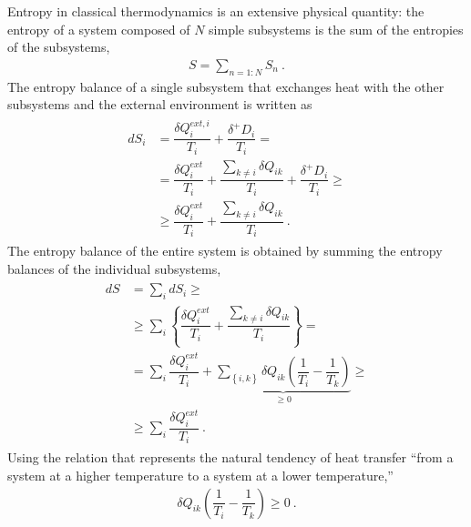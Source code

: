 \documentclass[letterpaper,10pt,english]{jupyterBook}
\begin{document}
\sphinxAtStartPar
Entropy in classical thermodynamics is an extensive physical quantity: the entropy of a system composed of \(N\) simple subsystems is the sum of the entropies of the subsystems,
\begin{equation*}
\begin{split}S = \sum_{n=1:N} S_n \ .\end{split}
\end{equation*}
\sphinxAtStartPar
The entropy balance of a single subsystem that exchanges heat with the other subsystems and the external environment is written as
\begin{equation*}
\begin{split}\begin{aligned}
    dS_i & = \dfrac{\delta Q^{ext,i}_i}{T_i} + \dfrac{\delta^+ D_i}{T_i} = \\
         & = \dfrac{\delta Q^{ext}_i}{T_i} + \dfrac{\sum_{k \ne i} \delta Q_{ik}}{T_i} + \dfrac{\delta^+ D_i}{T_i} \ge \\
         & \ge \dfrac{\delta Q^{ext}_i}{T_i} + \dfrac{\sum_{k \ne i} \delta Q_{ik}}{T_i} \ . 
  \end{aligned}\end{split}
\end{equation*}
\sphinxAtStartPar
The entropy balance of the entire system is obtained by summing the entropy balances of the individual subsystems,
\begin{equation*}
\begin{split}\begin{aligned}
    dS & = \sum_i d S_i \ge \\
       & \ge \sum_i \left\{ \dfrac{\delta Q^{ext}_i}{T_i} + \dfrac{\sum_{k \ne i} \delta Q_{ik}}{T_i} \right\} = \\
       & = \sum_i \dfrac{\delta Q^{ext}_i}{T_i} + \underbrace{\sum_{\left\{i,k\right\}} \delta Q_{ik} \left( \dfrac{1}{T_i} - \dfrac{1}{T_k} \right)}_{\ge 0} \ge \\
       & \ge \sum_i \dfrac{\delta Q^{ext}_i}{T_i} \ . 
  \end{aligned}\end{split}
\end{equation*}
\sphinxAtStartPar
Using the relation that represents the natural tendency of heat transfer “from a system at a higher temperature to a system at a lower temperature,”
\begin{equation*}
\begin{split}\delta Q_{ik} \left( \dfrac{1}{T_i} - \dfrac{1}{T_k} \right) \ge 0 \ .\end{split}
\end{equation*}
\sphinxAtStartPar
{} 
\end{document}
